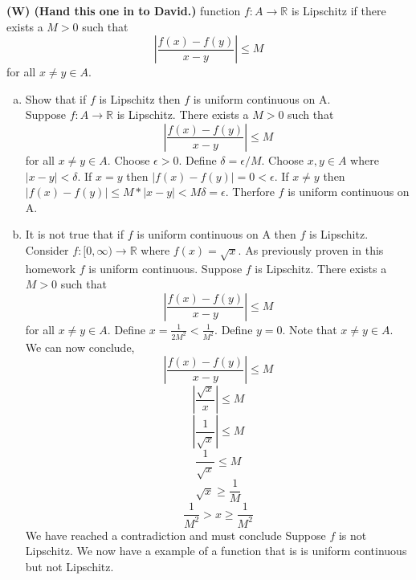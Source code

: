 \documentclass[12pt]{article}
\makeatletter
\theoremstyle{homework}
\newenvironment{exercise}[1]
{\def\@currentlabel{#1}\exercisecore}
{\endexercisecore}
\newcommand\W{{\color{red}\textbf{(W) (Hand this one in to David.)}}}
\makeatother
\begin{document}
\newpage
\W
\begin{exercise}

A function $f:A\rightarrow \mathbb{R}$ is Lipschitz if there exists a $M>0$ such that
$$|\frac{f(x)-f(y)}{x-y}|\leq M$$ for all $x\neq y\in A$.
\end{exercise}
\begin{enumerate}[(a)]
\item
Show that if $f$ is Lipschitz then $f$ is uniform continuous on A.\\
Suppose $f:A\rightarrow \mathbb{R}$ is Lipschitz.  There exists a $M>0$ such that
$$|\frac{f(x)-f(y)}{x-y}|\leq M$$ for all $x\neq y\in A$.  Choose $\epsilon>0$.  Define $\delta=\epsilon/M$.  Choose $x,y\in A$ where $|x-y|<\delta$.  If $x=y$ then $|f(x)-f(y)|=0<\epsilon$.  If $x\neq y$ then $|f(x)-f(y)|\leq M*|x-y|<M\delta=\epsilon$.  Therfore $f$ is uniform continuous on A.
\item
It is not true that if $f$ is uniform continuous on A then $f$ is Lipschitz.\\
Consider $f:[0,\infty)\rightarrow \mathbb{R}$ where $f(x)=\sqrt{x}$.  As previously proven in this homework $f$ is uniform continuous.  Suppose $f$ is Lipschitz.  There exists a $M>0$ such that $$|\frac{f(x)-f(y)}{x-y}|\leq M$$ for all $x\neq y\in A$.  Define $x=\frac{1}{2M^2}<\frac{1}{M^2}$.  Define $y=0$.  Note that $x\neq y\in A$.  We can now conclude,
$$|\frac{f(x)-f(y)}{x-y}|\leq M$$
$$|\frac{\sqrt{x}}{x}|\leq M$$
$$|\frac{1}{\sqrt{x}}|\leq M$$
$$\frac{1}{\sqrt{x}}\leq M$$
$$\sqrt{x}\geq \frac{1}{M}$$
$$\frac{1}{M^2}>x\geq \frac{1}{M^2}$$
We have reached a contradiction and must conclude Suppose $f$ is not Lipschitz.  We now have a example of a function that is is uniform continuous but not Lipschitz.
\end{enumerate}
\end{document}
